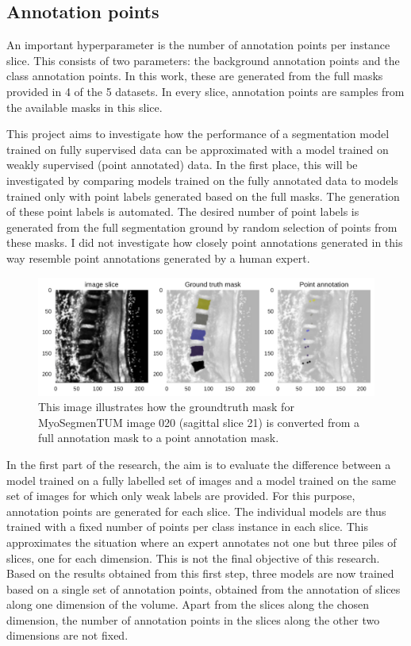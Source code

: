 \subsection{Annotation points\label{sec:annotationPoints}}
\par{
    An important hyperparameter is the number of annotation points per instance slice.
    This consists of two parameters: the background annotation points and the class annotation points.
    In this work, these are generated from the full masks provided in 4 of the 5 datasets.
    In every slice, annotation points are samples from the available masks in this slice.
}
\par{
    This project aims to investigate how the performance of a segmentation model trained on fully supervised data can be approximated with a model trained on weakly supervised (point annotated) data.
    In the first place, this will be investigated by comparing models trained on the fully annotated data to models trained only with point labels generated based on the full masks.
    The generation of these point labels is automated. 
    The desired number of point labels is generated from the full segmentation ground by random selection of points from these masks.
    I did not investigate how closely point annotations generated in this way resemble point annotations generated by a human expert.
}
\begin{figure}
    \includegraphics[width=.99\textwidth]{images/MyoSegmenTUM020_s21_points.pdf}
    \caption{This image illustrates how the \Gls{groundtruth} mask for MyoSegmenTUM image 020 (sagittal slice 21) is converted from a full annotation mask to a point annotation mask.
    \protect
    }
\end{figure}
\par{
    In the first part of the research, the aim is to evaluate the difference between a model trained on a fully labelled set of images and a model trained on the same set of images for which only weak labels are provided.
    For this purpose, annotation points are generated for each slice.
    The individual models are thus trained with a fixed number of points per class instance in each slice. 
    This approximates the situation where an expert annotates not one but three piles of slices, one for each dimension. This is not the final objective of this research.
    Based on the results obtained from this first step, three models are now trained based on a single set of annotation points, obtained from the annotation of slices along one dimension of the volume.
    Apart from the slices along the chosen dimension, the number of annotation points in the slices along the other two dimensions are not fixed.
}
\FloatBarrier

